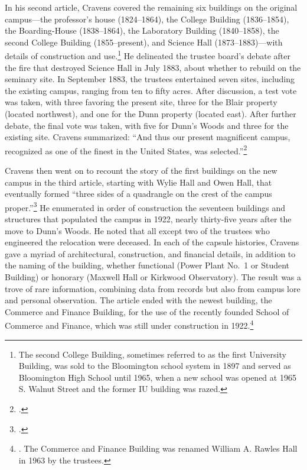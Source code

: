 \documentclass[
  american,
  letterpaper,
]{scrreprt}
\begin{document}
In his second article, Cravens covered the remaining six buildings on
the original campus---the professor's house (1824--1864), the College
Building (1836--1854), the Boarding-House (1838--1864), the Laboratory
Building (1840--1858), the second College Building (1855--present), and
Science Hall (1873--1883)---with details of construction and
use.\footnote{The second College Building, sometimes referred to as the
  first University Building, was sold to the Bloomington school system
  in 1897 and served as Bloomington High School until 1965, when a new
  school was opened at 1965 S. Walnut Street and the former IU building
  was razed.} He delineated the trustee board's debate after the fire
that destroyed Science Hall in July 1883, about whether to rebuild on
the seminary site. In September 1883, the trustees entertained seven
sites, including the existing campus, ranging from ten to fifty acres.
After discussion, a test vote was taken, with three favoring the present
site, three for the Blair property (located northwest), and one for the
Dunn property (located east). After further debate, the final vote was
taken, with five for Dunn's Woods and three for the existing site.
Cravens summarized: ``And thus our present magnificent campus,
recognized as one of the finest in the United States, was
selected.''\footnote{.}

Cravens then went on to recount the story of the first buildings on the
new campus in the third article, starting with Wylie Hall and Owen Hall,
that eventually formed ``three sides of a quadrangle on the crest of the
campus proper.''\footnote{.} He
enumerated in order of construction the seventeen buildings and
structures that populated the campus in 1922, nearly thirty-five years
after the move to Dunn's Woods. He noted that all except two of the
trustees who engineered the relocation were deceased. In each of the
capsule histories, Cravens gave a myriad of architectural, construction,
and financial details, in addition to the naming of the building,
whether functional (Power Plant No.~1 or Student Building) or honorary
(Maxwell Hall or Kirkwood Observatory). The result was a trove of rare
information, combining data from records but also from campus lore and
personal observation. The article ended with the newest building, the
Commerce and Finance Building, for the use of the recently founded
School of Commerce and Finance, which was still under construction in
1922.\footnote{. The
  Commerce and Finance Building was renamed William A. Rawles Hall in
  1963 by the trustees.}
\end{document}
